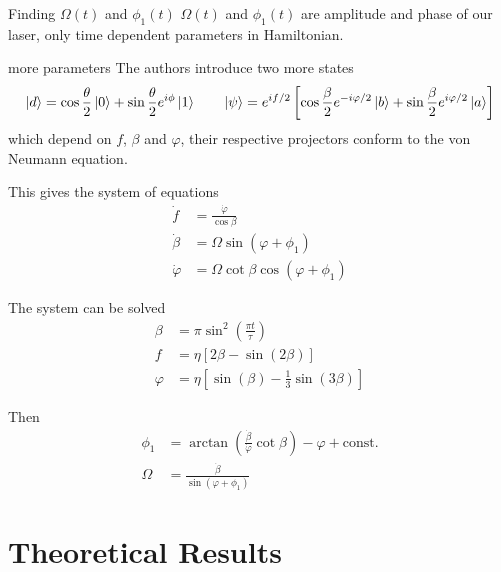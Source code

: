\documentclass[aspectratio=1610, 9pt]{beamer}
\begin{document}
\begin{frame}{Finding $\Omega(t)$ and $\phi_1(t)$}
    $\Omega(t)$ and $\phi_1(t)$ are amplitude and phase of our laser, only time dependent parameters
    in Hamiltonian.
    \begin{block}{more parameters}
      The authors introduce two more states
      \[
        \ket{d} = \cos\frac{\theta}{2} \ket{0} + \sin\frac{\theta}{2} e^{i\phi} \ket{1}
        \qquad
        \ket{\psi} = e^{if/2} \left[ \cos\frac{\beta}{2} e^{-i\varphi/2} \ket{b} + \sin\frac{\beta}{2} 
          e^{i\varphi/2} \ket{a} \right]
      \]
      which depend on $f$, $\beta$ and $\varphi$, 
      their respective projectors conform to the \alert{von
      Neumann equation}.

      This gives the system of equations
      \begin{align*}
        \dot f        &= \frac{\dot \varphi}{\cos \beta} \\
        \dot \beta    &= \Omega \sin(\varphi + \phi_1)  \\
        \dot \varphi  &= \Omega \cot\beta \cos(\varphi + \phi_1)
      \end{align*}
    \end{block}
\end{frame}

\begin{frame}
  The system can be solved
  \begin{align*}
    \beta   &= \pi \sin^2\left(\frac{\pi t}{\tau} \right) \\
    f       &= \eta \left[2\beta - \sin(2\beta) \right] \\
    \varphi &= \eta \left[\sin(\beta) - \frac{1}{3} \sin(3\beta) \right]
  \end{align*}

  Then 
  \begin{align*}
    \phi_1 &= \arctan\left(\frac{\dot \beta}{\dot \varphi} \cot\beta\right) - \varphi +
    \text{const.} \\
    \Omega &= \frac{\dot \beta}{\sin(\varphi + \phi_1)}
  \end{align*}
\end{frame}

\section{Theoretical Results}
\label{sec:Theoretical Results}
\end{document}
